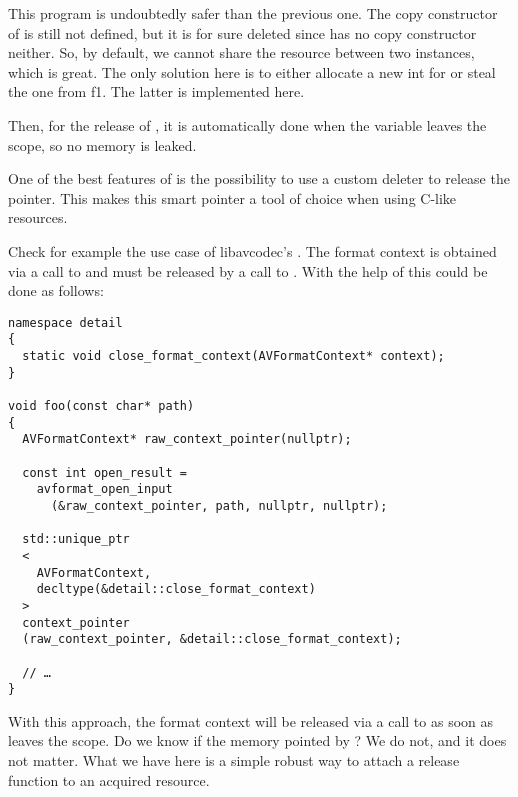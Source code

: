 This program is undoubtedly safer than the previous one. The copy
constructor of  is still not defined, but it is for sure
deleted since  has no copy constructor
neither. So, by default, we cannot share the resource between two
instances, which is great. The only solution here is to either
allocate a new int for  or steal the one from {f1}. The
latter is implemented here.

Then, for the release of , it is automatically done when the
variable leaves the scope, so no memory is leaked.

\bigskip

One of the best features of  is the possibility
to use a custom deleter to release the pointer. This makes this smart
pointer a tool of choice when using C-like resources.

Check for example the use case of libavcodec's
. The format context is obtained via a call to
 and must be released by a call to
. With the help of
 this could be done as follows:

\begin{lstlisting}
namespace detail
{
  static void close_format_context(AVFormatContext* context);
}

void foo(const char* path)
{
  AVFormatContext* raw_context_pointer(nullptr);

  const int open_result =
    avformat_open_input
      (&raw_context_pointer, path, nullptr, nullptr);

  std::unique_ptr
  <
    AVFormatContext,
    decltype(&detail::close_format_context)
  >
  context_pointer
  (raw_context_pointer, &detail::close_format_context);

  // …
}
\end{lstlisting}


With this approach, the format context will be released via a call to
 as soon as
 leaves the scope. Do we know if the memory
pointed by ? We do not, and it does not
matter. What we have here is a simple robust way to attach a release
function to an acquired resource.

\subsection{}

\subsection{}


